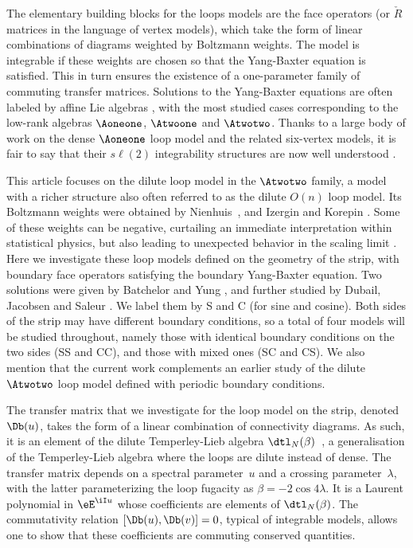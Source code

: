 \documentclass[11pt]{article}
\numberwithin{equation}{section}
\theoremstyle{alexi}
\begin{document}
The elementary building blocks for the loops models are the face operators (or $\check R$ matrices in the language of vertex models), which take the form of linear combinations of diagrams weighted by Boltzmann weights. The model is  integrable if these weights are chosen so that the Yang-Baxter equation is satisfied. This in turn ensures the existence of a one-parameter family of commuting transfer matrices. Solutions to the Yang-Baxter equations are often labeled by affine Lie algebras \cite{B85,J86}, with the most studied cases corresponding to the low-rank algebras $\Aoneone$, $\Atwoone$ and $\Atwotwo$. Thanks to a large body of work on the dense $\Aoneone$ loop model and the related six-vertex models, it is fair to say that their $s\ell(2)$ integrability structures are now well understood \cite{BAXTER,ZP95,BazhMang2007,AMDPPJR14,FrahmMDP2019}. 

This article focuses on the dilute loop model in the $\Atwotwo$ family, a model with a richer structure also often referred to as the dilute $O(n)$ loop model. Its Boltzmann weights were obtained by Nienhuis~\cite{Nienhuis}, and Izergin and Korepin \cite{IK81}. Some of these weights can be negative, curtailing an immediate interpretation within statistical physics, but also leading to unexpected behavior in the scaling limit \cite{VJS2014}. Here we investigate these loop models defined on the geometry of the strip, with boundary face operators satisfying the boundary Yang-Baxter equation. Two solutions were given by Batchelor and Yung \cite{BatchelorYung}, and further studied by Dubail, Jacobsen and Saleur \cite{DJS10}. We label them by S and C (for sine and cosine). Both sides of the strip may have different boundary conditions, so a total of four models will be studied throughout, namely those with identical boundary conditions on the two sides (SS and CC), and those with mixed ones (SC and CS). We also mention that the current work complements an earlier study \cite{AMDPP19} of the dilute $\Atwotwo$ loop model defined with periodic boundary conditions. 

The transfer matrix that we investigate for the loop model on the strip, denoted $\Db(u)$, takes the form of a linear combination of connectivity diagrams. As such, it is an element of the dilute Temperley-Lieb algebra $\dtl_N(\beta)$~\cite{GP93,P94,Grimm96,JBYSA13}, a generalisation of the Temperley-Lieb algebra \cite{TL71,VFRJ99} where the loops are dilute instead of dense. The transfer matrix depends on a spectral parameter~$u$ and a crossing parameter~$\lambda$, with the latter parameterizing the loop fugacity as $\beta = -2 \cos 4 \lambda$. It is a Laurent polynomial in $\eE^{\iI u}$ whose coefficients are elements of $\dtl_N(\beta)$. The commutativity relation \mbox{$[\Db(u),\Db(v)]=0$}, typical of integrable models, allows one to show that these coefficients are commuting conserved quantities. 
\end{document}
